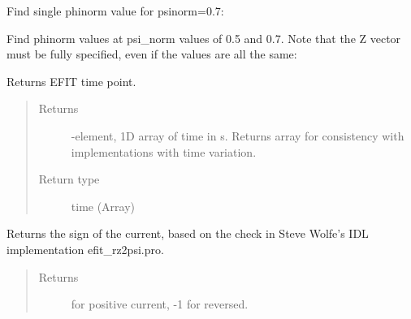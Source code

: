 \documentclass[letterpaper,10pt,english]{sphinxmanual}
\begin{document}
\begin{fulllineitems}
\begin{fulllineitems}
Find single phinorm value for psinorm=0.7:

\begin{sphinxVerbatim}[commandchars=\\\{\}]
  
\end{sphinxVerbatim}

Find phinorm values at psi\_norm values of 0.5 and 0.7.
Note that the Z vector must be fully specified, even if the
values are all the same:

\begin{sphinxVerbatim}[commandchars=\\\{\}]
  \PYG{p}{[} \PYG{p}{]}
\end{sphinxVerbatim}

\end{fulllineitems}


\begin{fulllineitems}
\label{\detokenize{eqtools:eqtools.eqdskreader.EqdskReader.getTimeBase}}
Returns EFIT time point.
\begin{quote}\begin{description}
\item[{Returns}] -element, 1D array of time in s.  Returns array for
consistency with {\hyperref[\detokenize{eqtools:eqtools.core.Equilibrium}]{}}
implementations with time variation.

\item[{Return type}] \leavevmode
time (Array)

\end{description}\end{quote}

\end{fulllineitems}


\begin{fulllineitems}
\label{\detokenize{eqtools:eqtools.eqdskreader.EqdskReader.getCurrentSign}}
Returns the sign of the current, based on the check in Steve Wolfe’s
IDL implementation efit\_rz2psi.pro.
\begin{quote}\begin{description}
\item[{Returns}]  for positive current, -1 for reversed.


\end{description}
\end{quote}
\end{fulllineitems}
\end{fulllineitems}
\end{document}
